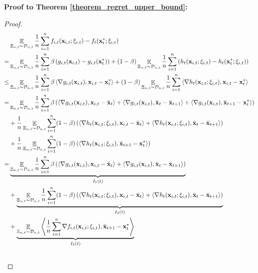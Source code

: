 \documentclass{article}
\begin{document}
\textbf{Proof to Theorem \ref{theorem_regret_upper_bound}:}
\begin{proof}
\begin{align}
\nonumber
& \mathop{\mathbb{E}}_{ \Xi_{n,t} \sim \mathcal{D}_{n,t} } \frac{1}{n}\sum_{i=1}^n f_{i,t}({\bf x}_{i,t};\xi_{i,t}) - f_t({\bf x}_t^\ast;\xi_{i,t}) \\ \nonumber
=& \mathop{\mathbb{E}}_{ \Xi_{n,t} \sim \mathcal{D}_{n,t} }\frac{1}{n}\sum_{i=1}^n \beta \left( g_{i,t}({\bf x}_{i,t}) - g_{i,t}({\bf x}_t^\ast) \right) + (1-\beta) \mathop{\mathbb{E}}_{ \Xi_{n,t} \sim \mathcal{D}_{n,t} }\frac{1}{n}\sum_{i=1}^n \left( h_t({\bf x}_{i,t};\xi_{i,t}) - h_t({\bf x}_t^\ast;\xi_{i,t}) \right) \\ \nonumber
\le & \mathop{\mathbb{E}}_{ \Xi_{n,t} \sim \mathcal{D}_{n,t} }\frac{1}{n}\sum_{i=1}^n \beta \left\langle\nabla g_{i,t}({\bf x}_{i,t}), {\bf x}_{i,t} - {\bf x}_t^\ast  \right\rangle + (1-\beta) \mathop{\mathbb{E}}_{ \Xi_{n,t} \sim \mathcal{D}_{n,t} } \frac{1}{n}\sum_{i=1}^n \left\langle\nabla h_t({\bf x}_{i,t};\xi_{i,t}), {\bf x}_{i,t} - {\bf x}_t^\ast  \right\rangle \\ \nonumber
 = & \mathop{\mathbb{E}}_{ \Xi_{n,t} \sim \mathcal{D}_{n,t} }\frac{1}{n}\sum_{i=1}^n \beta \left( \left\langle\nabla g_{i,t}({\bf x}_{i,t}), {\bf x}_{i,t} - \bar{{\bf x}}_t  \right\rangle + \left\langle\nabla g_{i,t}({\bf x}_{i,t}), \bar{{\bf x}}_t - \bar{{\bf x}}_{t+1} \right\rangle + \left\langle\nabla g_{i,t}({\bf x}_{i,t}), \bar{{\bf x}}_{t+1} - {\bf x}_t^\ast   \right\rangle  \right) \\ \nonumber 
 & + \frac{1}{n}\mathop{\mathbb{E}}_{ \Xi_{n,t} \sim \mathcal{D}_{n,t} }\sum_{i=1}^n (1-\beta) \left(   \left\langle\nabla h_t({\bf x}_{i,t};\xi_{i,t}), {\bf x}_{i,t} - \bar{{\bf x}}_t  \right\rangle +  \left\langle\nabla h_t({\bf x}_{i,t};\xi_{i,t}), \bar{{\bf x}}_t - \bar{{\bf x}}_{t+1}  \right\rangle  \right) \\ \nonumber 
 & + \frac{1}{n}\mathop{\mathbb{E}}_{ \Xi_{n,t} \sim \mathcal{D}_{n,t} }\sum_{i=1}^n (1-\beta) \left(  \left\langle\nabla h_t({\bf x}_{i,t};\xi_{i,t}), \bar{{\bf x}}_{t+1} - {\bf x}_t^\ast  \right\rangle  \right)\\ \nonumber
= & \underbrace{ \mathop{\mathbb{E}}_{ \Xi_{n,t} \sim \mathcal{D}_{n,t} } \frac{1}{n}\sum_{i=1}^n \beta \left( \left\langle\nabla g_{i,t}({\bf x}_{i,t}), {\bf x}_{i,t} - \bar{{\bf x}}_t  \right\rangle + \left\langle\nabla g_{i,t}({\bf x}_{i,t}), \bar{{\bf x}}_t - \bar{{\bf x}}_{t+1}  \right\rangle  \right) }_{I_1(t)} \\ \nonumber 
 & + \underbrace{ \mathop{\mathbb{E}}_{ \Xi_{n,t} \sim \mathcal{D}_{n,t} } \frac{1}{n}\sum_{i=1}^n (1-\beta) \left(  \left\langle\nabla h_t({\bf x}_{i,t}; \xi_{i,t}), {\bf x}_{i,t} - \bar{{\bf x}}_t  \right\rangle +   \left\langle\nabla h_t({\bf x}_{i,t};\xi_{i,t}), \bar{{\bf x}}_t - \bar{{\bf x}}_{t+1}  \right\rangle \right) }_{I_2(t)}\\ \nonumber 
&+ \underbrace{ \mathop{\mathbb{E}}_{ \Xi_{n,t} \sim \mathcal{D}_{n,t} } \left\langle\frac{1}{n}\sum_{i=1}^n\nabla f_{i,t}({\bf x}_{i,t};\xi_{i,t}), \bar{{\bf x}}_{t+1} - {\bf x}_t^\ast  \right\rangle }_{I_3(t)}\\ \nonumber
\end{align}


\end{proof}
\end{document}
